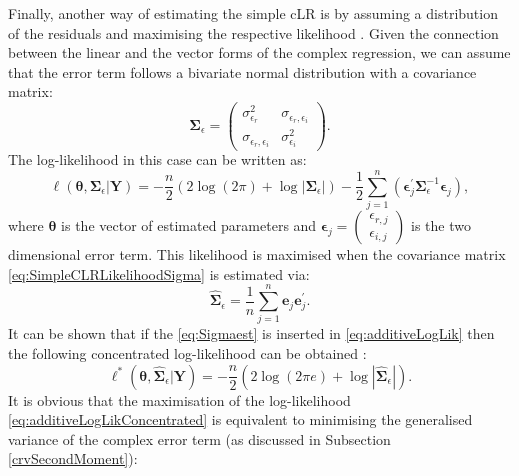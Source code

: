 \documentclass[
]{book}
\begin{document}
Finally, another way of estimating the simple cLR is by assuming a distribution of the residuals and maximising the respective likelihood \citep{VandenBos1994}. Given the connection between the linear and the vector forms of the complex regression, we can assume that the error term follows a bivariate normal distribution with a covariance matrix:
\begin{equation}
    \boldsymbol{\Sigma}_{\epsilon} = \begin{pmatrix} \sigma_{\epsilon_r}^2 & \sigma_{\epsilon_r, \epsilon_i} \\ \sigma_{\epsilon_r, \epsilon_i} & \sigma_{\epsilon_i}^2 \end{pmatrix} .
    \label{eq:SimpleCLRLikelihoodSigma}
\end{equation}
The log-likelihood in this case can be written as:
\begin{equation}
    \ell(\boldsymbol{\theta}, \boldsymbol{\Sigma}_\epsilon | \mathbf{Y}) = -\frac{n}{2} \left( 2 \log(2 \pi) + \log | \boldsymbol{\Sigma}_\epsilon| \right) -\frac{1}{2} \sum_{j=1}^n \left( \boldsymbol{\epsilon}_j^\prime \boldsymbol{\Sigma}_\epsilon^{-1} \boldsymbol{\epsilon}_j \right) ,
    \label{eq:additiveLogLik}
\end{equation}
where \(\boldsymbol{\theta}\) is the vector of estimated parameters and \(\boldsymbol{\epsilon}_j = \begin{pmatrix} \epsilon_{r,j} \\ \epsilon_{i,j} \end{pmatrix}\) is the two dimensional error term. This likelihood is maximised when the covariance matrix \eqref{eq:SimpleCLRLikelihoodSigma} is estimated via:
\begin{equation}
    \hat{\boldsymbol{\Sigma}}_\epsilon = \frac{1}{n} \sum_{j=1}^{n} \boldsymbol{e}_j \boldsymbol{e}_j^\prime .
    \label{eq:Sigmaest}
\end{equation}
It can be shown that if the \eqref{eq:Sigmaest} is inserted in \eqref{eq:additiveLogLik} then the following concentrated log-likelihood can be obtained \citep[see, for example,][]{Snyder2017, Svetunkov2021a}:
\begin{equation}
    \ell^*(\boldsymbol{\theta}, \hat{\boldsymbol{\Sigma}}_\epsilon | \mathbf{Y}) = -\frac{n}{2} \left( 2 \log(2 \pi e) + \log | \hat{\boldsymbol{\Sigma}}_\epsilon | \right) .
    \label{eq:additiveLogLikConcentrated}
\end{equation}
It is obvious that the maximisation of the log-likelihood \eqref{eq:additiveLogLikConcentrated} is equivalent to minimising the generalised variance of the complex error term (as discussed in Subsection \ref{crvSecondMoment}):
\end{document}
